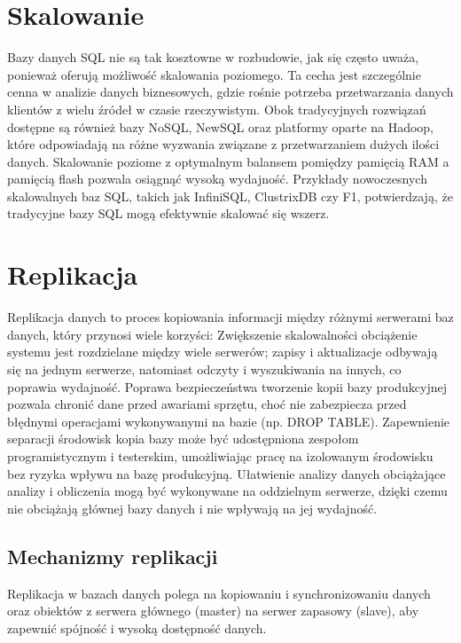 \documentclass[a4paper,11pt,openany,english]{sphinxmanual}
\begin{document}
\section{Skalowanie}
\label{\detokenize{rozdzial2/index:skalowanie}}
\sphinxAtStartPar
Bazy danych SQL nie są tak kosztowne w rozbudowie, jak się często uważa, ponieważ oferują możliwość skalowania poziomego. Ta cecha jest szczególnie cenna w analizie danych biznesowych, gdzie rośnie potrzeba przetwarzania danych klientów z wielu źródeł w czasie rzeczywistym. Obok tradycyjnych rozwiązań dostępne są również bazy NoSQL, NewSQL oraz platformy oparte na Hadoop, które odpowiadają na różne wyzwania związane z przetwarzaniem dużych ilości danych. Skalowanie poziome z optymalnym balansem pomiędzy pamięcią RAM a pamięcią flash pozwala osiągnąć wysoką wydajność. Przykłady nowoczesnych skalowalnych baz SQL, takich jak InfiniSQL, ClustrixDB czy F1, potwierdzają, że tradycyjne bazy SQL mogą efektywnie skalować się wszerz.


\section{Replikacja}
\label{\detokenize{rozdzial2/index:replikacja}}
\sphinxAtStartPar
Replikacja danych to proces kopiowania informacji między różnymi serwerami baz danych, który przynosi wiele korzyści:
\sphinxhyphen{} Zwiększenie skalowalności \textendash{} obciążenie systemu jest rozdzielane między wiele serwerów; zapisy i aktualizacje odbywają się na jednym serwerze, natomiast odczyty i wyszukiwania na innych, co poprawia wydajność.
\sphinxhyphen{} Poprawa bezpieczeństwa \textendash{} tworzenie kopii bazy produkcyjnej pozwala chronić dane przed awariami sprzętu, choć nie zabezpiecza przed błędnymi operacjami wykonywanymi na bazie (np. DROP TABLE).
\sphinxhyphen{} Zapewnienie separacji środowisk \textendash{} kopia bazy może być udostępniona zespołom programistycznym i testerskim, umożliwiając pracę na izolowanym środowisku bez ryzyka wpływu na bazę produkcyjną.
\sphinxhyphen{} Ułatwienie analizy danych \textendash{} obciążające analizy i obliczenia mogą być wykonywane na oddzielnym serwerze, dzięki czemu nie obciążają głównej bazy danych i nie wpływają na jej wydajność.


\subsection{Mechanizmy replikacji}
\label{\detokenize{rozdzial2/index:mechanizmy-replikacji}}
\sphinxAtStartPar
Replikacja w bazach danych polega na kopiowaniu i synchronizowaniu danych oraz obiektów z serwera głównego (master) na serwer zapasowy (slave), aby zapewnić spójność i wysoką dostępność danych.
\end{document}
